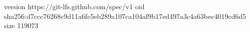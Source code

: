 version https://git-lfs.github.com/spec/v1
oid sha256:d7ccc76268c9d11a6fc5eb289a107ca104af9b17ed497a3c4a63bec4019cd6d5
size 119073
